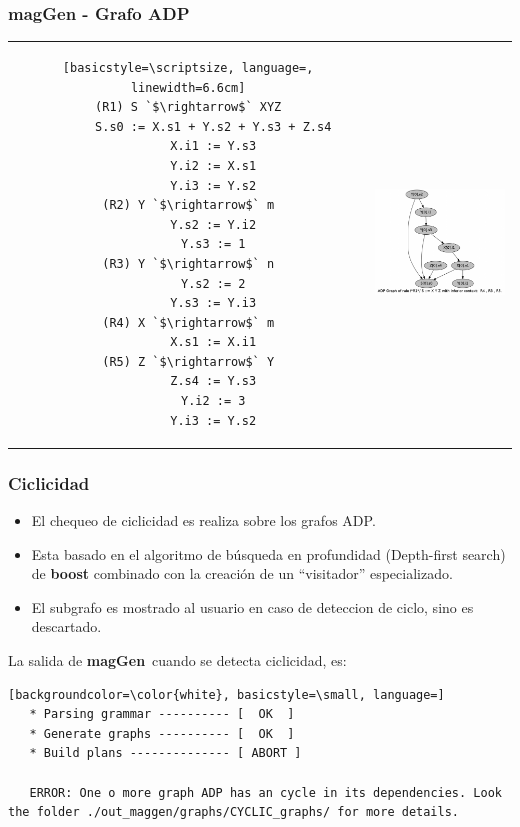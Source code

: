 \documentclass[10pt]{beamer}
\newcommand{\maggen}{\textbf{magGen}}
\begin{document}
\begin{frame}[fragile]
        \frametitle{magGen - Grafo ADP}
\begin{tabular}{cp{4.5cm}}
\hspace{-0.5cm}\begin{lstlisting}[basicstyle=\scriptsize, language=, linewidth=6.6cm]
(R1) S `$\rightarrow$` XYZ
       S.s0 := X.s1 + Y.s2 + Y.s3 + Z.s4
       X.i1 := Y.s3
       Y.i2 := X.s1
       Y.i3 := Y.s2
(R2) Y `$\rightarrow$` m
       Y.s2 := Y.i2
       Y.s3 := 1
(R3) Y `$\rightarrow$` n
       Y.s2 := 2
       Y.s3 := Y.i3
(R4) X `$\rightarrow$` m
       X.s1 := X.i1
(R5) Z `$\rightarrow$` Y
       Z.s4 := Y.s3
       Y.i2 := 3
       Y.i3 := Y.s2
\end{lstlisting}
&\hspace{0.2cm}\parbox[c]{1em}{\includegraphics[width=149px, height=150px]{./16_adp_graph.png}}
\end{tabular}

\end{frame}

\begin{frame}[fragile]
\frametitle{Ciclicidad}

\begin{block}{}
\begin{itemize}
\item El chequeo de ciclicidad es realiza sobre los grafos ADP.
\item Esta basado en el algoritmo de búsqueda en profundidad (Depth-first search) de \textbf{boost} combinado con la creación de un ``visitador'' especializado.
\item El subgrafo es mostrado al usuario en caso de deteccion de ciclo, sino es descartado.
\end{itemize}
\end{block}

La salida de \maggen\ cuando se detecta ciclicidad, es:

\begin{lstlisting}[backgroundcolor=\color{white}, basicstyle=\small, language=] 
   * Parsing grammar ---------- [  OK  ]
   * Generate graphs ---------- [  OK  ]
   * Build plans -------------- [ ABORT ]

   ERROR: One o more graph ADP has an cycle in its dependencies. Look the folder ./out_maggen/graphs/CYCLIC_graphs/ for more details.
\end{lstlisting}

\end{frame}
\end{document}
